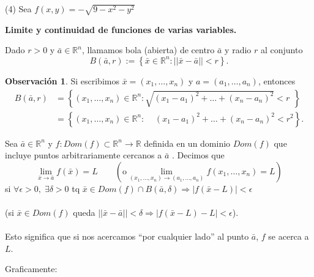 \documentclass{article}
\theoremstyle{definition}
\theoremstyle{definition}
\newtheorem*{obs}{Observación}
\theoremstyle{remark}
\begin{document}
\textcolor{verdep2}{(4)} Sea $f(x,y)=-\sqrt{9-x^2-y^2}$ 
\begin{figure}[h]
\centering
\def\svgwidth{1\textwidth}

\end{figure} 
\begin{center}
\textbf{Limite y continuidad de funciones de varias variables.}
\end{center}
\begin{defi}
  Dado $r>0$ y $\bar{a} \in \mathbb{R}^n$, llamamos bola (abierta) de centro $\bar{a}$ y radio $r$ al conjunto \[ 
    B(\bar{a},r) := \left\{\bar{x} \in \mathbb{R}^n : || \bar{x} - \bar{a} || < r\right\}
  .\]
\end{defi}
\begin{obs}
  Si escribimos $\bar{x}=(x_1,\dots,x_n)$ y $a=(a_1,\dots, a_n)$, entonces \[
    \begin{array}{lllll}
      B(\bar{a},r)&=\left\{(x_1,\dots,x_n) \in \mathbb{R}^n : \sqrt{(x_1-a_1)^2+\dots + (x_n-a_n)^2}<r^{\phantom{2}}\right\}\\
                  &=\left\{(x_1,\dots,x_n)\in\mathbb{R}^n : \; \; \; \;  (x_1-a_1)^2+\dots+(x_n-a_n)^2 < r^2\right\}.
    \end{array}
  \]
\end{obs}
\begin{figure}[h]
\centering
\def\svgwidth{1\textwidth}

\end{figure} 
\begin{defi}[Límite] Sea $\bar{a} \in \mathbb{R}^n$ y $f : Dom(f) \subset \mathbb{R}^n \to \mathbb{R}$ definida en un dominio $Dom(f)$ que incluye puntos arbitrariamente cercanos a $\bar{a}$ . Decimos que \[ 
  \lim_{\bar{x} \to \bar{a}}{f(\bar{x})}=L \quad \quad \left(\text{o} \lim_{(x_1,\dots,x_n) \to (a_1, \dots ,a_n)}{f(x_1,\dots,x_n)}=L\right)
\]
\phantom{(}si $\forall \epsilon > 0,\; \exists \delta > 0$ \; tq \; $\bar{x} \in Dom(f) \cap B(\bar{a},\delta) \Rightarrow \big|f(\bar{x}-L) \big| < \epsilon$\\\\ \big(si $\bar{x} \in Dom(f)$ \; queda \; $||\bar{x}-\bar{a}|| < \delta \Rightarrow \big|f(\bar{x}-L)-L\big|<\epsilon$\big). \\\\ Esto significa que si nos acercamos ``por cualquier lado'' al punto $\bar{a}$, $f$ se acerca a $L$.
\end{defi}
Graficamente: 
\begin{figure}[h]
\centering
\def\svgwidth{0.55\textwidth}

\end{figure} \\
\end{document}
